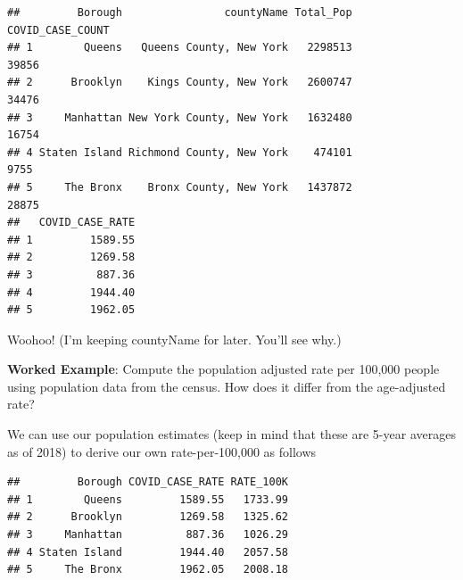\documentclass[openany]{book}
\newenvironment{Shaded}{\begin{snugshade}}{\end{snugshade}}
\newcommand{\DataTypeTok}[1]{\textcolor[rgb]{0.13,0.29,0.53}{#1}}
\newcommand{\DecValTok}[1]{\textcolor[rgb]{0.00,0.00,0.81}{#1}}
\newcommand{\KeywordTok}[1]{\textcolor[rgb]{0.13,0.29,0.53}{\textbf{#1}}}
\newcommand{\NormalTok}[1]{#1}
\newcommand{\OperatorTok}[1]{\textcolor[rgb]{0.81,0.36,0.00}{\textbf{#1}}}
\newcommand{\StringTok}[1]{\textcolor[rgb]{0.31,0.60,0.02}{#1}}
\begin{document}
\begin{Shaded}
\end{Shaded}

\begin{verbatim}
##         Borough                countyName Total_Pop COVID_CASE_COUNT
## 1        Queens   Queens County, New York   2298513            39856
## 2      Brooklyn    Kings County, New York   2600747            34476
## 3     Manhattan New York County, New York   1632480            16754
## 4 Staten Island Richmond County, New York    474101             9755
## 5     The Bronx    Bronx County, New York   1437872            28875
##   COVID_CASE_RATE
## 1         1589.55
## 2         1269.58
## 3          887.36
## 4         1944.40
## 5         1962.05
\end{verbatim}

Woohoo! (I'm keeping countyName for later. You'll see why.)

\textbf{Worked Example}: Compute the population adjusted rate per 100,000 people using population data from the census. How does it differ from the age-adjusted rate?

We can use our population estimates (keep in mind that these are 5-year averages as of 2018) to derive our own rate-per-100,000 as follows

\begin{Shaded}
\end{Shaded}

\begin{verbatim}
##         Borough COVID_CASE_RATE RATE_100K
## 1        Queens         1589.55   1733.99
## 2      Brooklyn         1269.58   1325.62
## 3     Manhattan          887.36   1026.29
## 4 Staten Island         1944.40   2057.58
## 5     The Bronx         1962.05   2008.18
\end{verbatim}
\end{document}
